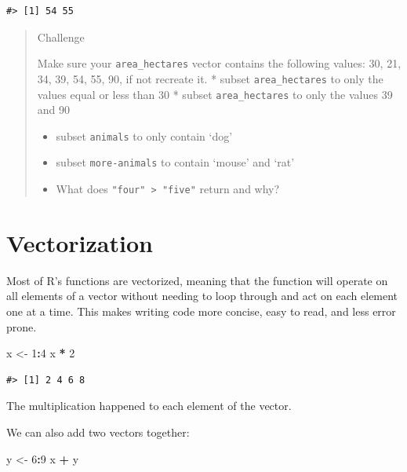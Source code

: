 \documentclass[
]{book}
\newenvironment{Shaded}{\begin{snugshade}}{\end{snugshade}}
\newcommand{\DecValTok}[1]{\textcolor[rgb]{0.00,0.00,0.81}{#1}}
\newcommand{\NormalTok}[1]{#1}
\newcommand{\OtherTok}[1]{\textcolor[rgb]{0.56,0.35,0.01}{#1}}
\newcommand{\SpecialCharTok}[1]{\textcolor[rgb]{0.81,0.36,0.00}{\textbf{#1}}}
\begin{document}
\begin{verbatim}
#> [1] 54 55
\end{verbatim}

\begin{quote}
Challenge

Make sure your \texttt{area\_hectares} vector contains the following values: 30, 21, 34, 39, 54, 55, 90, if not recreate it.
* subset \texttt{area\_hectares} to only the values equal or less than 30
* subset \texttt{area\_hectares} to only the values 39 and 90

\begin{itemize}
\item
  subset \texttt{animals} to only contain `dog'
\item
  subset \texttt{more-animals} to contain `mouse' and `rat'
\item
  What does \texttt{"four"\ \textgreater{}\ "five"} return and why?
\end{itemize}
\end{quote}

\section{Vectorization}\label{vectorization}

Most of R's functions are vectorized, meaning that the function will operate on all elements of a vector without needing to loop through and act on each element one at a time. This makes writing code more concise, easy to read, and less error prone.

\begin{Shaded}
\begin{Highlighting}[]
\NormalTok{x }\OtherTok{\textless{}{-}} \DecValTok{1}\SpecialCharTok{:}\DecValTok{4}
\NormalTok{x }\SpecialCharTok{*} \DecValTok{2}
\end{Highlighting}
\end{Shaded}

\begin{verbatim}
#> [1] 2 4 6 8
\end{verbatim}

The multiplication happened to each element of the vector.

We can also add two vectors together:

\begin{Shaded}
\begin{Highlighting}[]
\NormalTok{y }\OtherTok{\textless{}{-}} \DecValTok{6}\SpecialCharTok{:}\DecValTok{9}
\NormalTok{x }\SpecialCharTok{+}\NormalTok{ y}
\end{Highlighting}
\end{Shaded}
\end{document}
